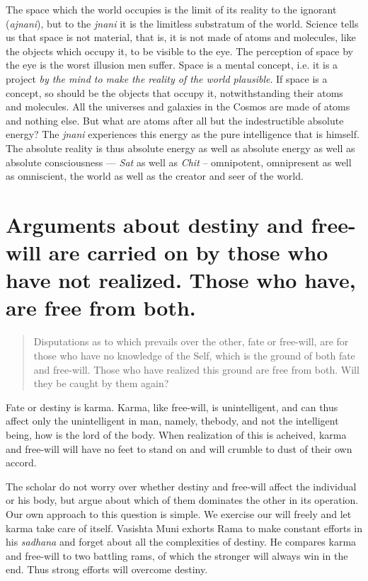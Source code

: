 \documentclass[12pt]{report}
\begin{document}

The space which the world occupies is the limit of its reality to the
ignorant (\emph{ajnani}), but to the \emph{jnani} it is the limitless
substratum of the world. Science tells us that space is not material,
that is, it is not made of atoms and molecules, like the objects which
occupy it, to be visible to the eye. The perception of space by the
eye is the worst illusion men suffer. Space is a mental concept,
i.e. it is a project \emph{by the mind to make the reality of the
  world plausible}. If space is a concept, so should be the objects
that occupy it, notwithstanding their atoms and molecules. All the
universes and galaxies in the Cosmos are made of atoms and nothing
else. But what are atoms after all but the indestructible absolute
energy? The \emph{jnani} experiences this energy as the pure
intelligence that is himself. The absolute reality is thus absolute
energy as well as absolute energy as well as absolute consciousness
--- \emph{Sat} as well as \emph{Chit} -- omnipotent, omnipresent as
well as omniscient, the world as well as the creator and seer of the
world. 

\section{ Arguments about destiny and free-will are carried on by
  those who have not realized. Those who have, are free from both.}

\begin{quote}
  Disputations as to which prevails over the other, fate or free-will,
  are for those who have no knowledge of the Self, which is the ground
  of both fate and free-will. Those who have realized this ground are
  free from both. Will they be caught by them again?
\end{quote}


Fate or destiny is karma. Karma, like free-will, is unintelligent, and
can thus affect only the unintelligent in man, namely, thebody, and
not the intelligent being, how is the lord of the body. When
realization of this is acheived, karma and free-will will have no feet
to stand on and will crumble to dust of their own accord.

The scholar do not worry over whether destiny and free-will affect the
individual or his body, but argue about which of them dominates the
other in its operation. Our own approach to this question is
simple. We exercise our will freely and let karma take care of
itself. Vasishta Muni exhorts Rama to make constant efforts in his
\emph{sadhana} and forget about all the complexities of destiny. He
compares karma and free-will to two battling rams, of which the
stronger will always win in the end. Thus strong efforts will overcome
destiny.
\end{document}
